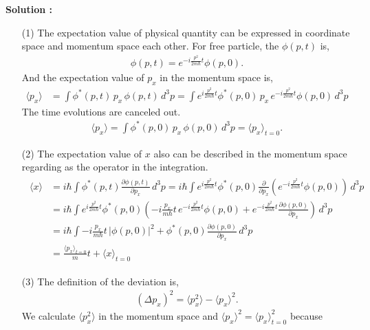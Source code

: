 \documentclass[floatfix,nofootinbib,superscriptaddress,fleqn]{revtex4-2}
\begin{document}
\noindent \textbf{Solution : }
\begin{itemize}
  \item[(1)]The expectation value of physical quantity can be 
  expressed in coordinate space and momentum space each other.
  For free particle, the $\phi(p,t)$ is,
  \begin{align}\label{phi:te}
    \phi(p,t)=e^{-i\frac{p^2}{2m\hbar}t}\phi(p,0)  .
  \end{align}
  And the expectation value of $p_x$ in the momentum space is,
  \begin{align*}
    \langle p_x \rangle &= \int \phi^*(p,t)\,p_x\,\phi(p,t)\,d^3p
    =\int e^{i\frac{p^2}{2m\hbar}t}\phi^*(p,0)\,p_x\,
    e^{-i\frac{p^2}{2m\hbar}t}\phi(p,0)\,d^3p
  \end{align*}
  The time evolutions are canceled out.
  \begin{align}\label{thm:px}
    \langle p_x \rangle=\int \phi^*(p,0)\,p_x\,\phi(p,0)\,d^3p 
    = \langle p_x \rangle_{t=0}.
  \end{align}
  \item[(2)] The expectation value of $x$ also can be described in 
  the momentum space regarding as the operator in the integration.
  \begin{align}
    \begin{split}
      \langle x\rangle &= i\hbar\int \phi^*(p,t)
      \frac{\partial\phi(p,t)}{\partial p_x}\,d^3p 
    =i\hbar\int e^{i\frac{p^2}{2m\hbar}t}\phi^*(p,0)
    \frac{\partial}{\partial p_x}\left(e^{-i
    \frac{p^2}{2m\hbar}t}\phi(p,0)\right)\,d^3p  \\
    &=i\hbar\int e^{i\frac{p^2}{2m\hbar}t}\phi^*(p,0)
    \left(-i\frac{p_x}{m\hbar}t\,e^{-i\frac{p^2}{2m\hbar}t}\phi(p,0)
    +e^{-i\frac{p^2}{2m\hbar}t}
    \frac{\partial \phi(p,0)}{\partial p_x}\right)\,d^3p \\
    &=i\hbar\int -i\frac{p_x}{m\hbar}t\,|\phi(p,0)|^2
    +\phi^*(p,0)\frac{\partial \phi(p,0)}{\partial p_x}\,d^3p \\
    &=\frac{\langle p_x\rangle_{t=0}}{m}t+\langle x\rangle_{t=0} 
    \end{split}
  \end{align}
  \item[(3)] The definition of the deviation is,
  \begin{align}\label{def:deviation}
    (\Delta p_x)^2 = \langle p_x^2 \rangle-\langle p_x \rangle^2. 
  \end{align}
  We calculate $\langle p_x^2 \rangle$ in the momentum space 
  and $\langle p_x \rangle^2=\langle p_x \rangle^2_{t=0}$ because 

\end{itemize}
\end{document}

